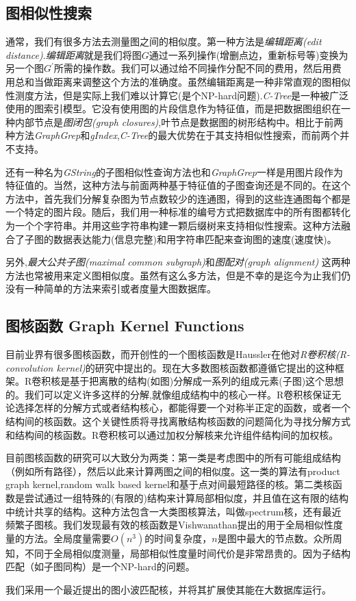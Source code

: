 \documentclass{article}
\begin{document}
\subsection{图相似性搜索}
通常，我们有很多方法去测量图之间的相似度。第一种方法是\emph{编辑距离(edit distance)}.\emph{编辑距离}就是我们将图$G$通过一系列操作(增删点边，重新标号等)变换为另一个图$G^{'}$所需的操作数。我们可以通过给不同操作分配不同的费用，然后用费用总和当做距离来调整这个方法的准确度。虽然编辑距离是一种非常直观的图相似性测度方法，但是实际上我们难以计算它(是个NP-hard问题).\emph{C-Tree}\cite{C-Tree}是一种被广泛使用的图索引模型。它没有使用图的片段信息作为特征值，而是把数据图组织在一种内部节点是\emph{图闭包(graph closures)},叶节点是数据图的树形结构中。相比于前两种方法\emph{GraphGrep}和\emph{gIndex},\emph{C-Tree}的最大优势在于其支持相似性搜索，而前两个并不支持。

还有一种名为\emph{GString}的子图相似性查询方法也和\emph{GraphGrep}一样是用图片段作为特征值的。当然，这种方法与前面两种基于特征值的子图查询还是不同的。在这个方法中，首先我们分解复杂图为节点数较少的连通图，得到的这些连通图每个都是一个特定的图片段。随后，我们用一种标准的编号方式把数据库中的所有图都转化为一个个字符串。并用这些字符串构建一颗后缀树来支持相似性搜索。这种方法融合了子图的数据表达能力(信息完整)和用字符串匹配来查询图的速度(速度快)。

另外,\emph{最大公共子图(maximal common subgraph)}\cite{mcs}和\emph{图配对(graph alignment)}\cite{assignment,assigment08} 这两种方法也常被用来定义图相似度。虽然有这么多方法，但是不幸的是迄今为止我们仍没有一种简单的方法来索引或者度量大图数据库。

\subsection{图核函数 Graph Kernel Functions}
目前业界有很多图核函数，而开创性的一个图核函数是Haussler在他对\emph{R卷积核(R-convolution kernel)}的研究中提出的。现在大多数图核函数都遵循它提出的这种框架。R卷积核是基于把离散的结构(如图)分解成一系列的组成元素(子图)这个思想的。我们可以定义许多这样的分解,就像组成结构中的核心一样。R卷积核保证无论选择怎样的分解方式或者结构核心，都能得要一个对称半正定的函数，或者一个结构间的核函数。这个关键性质将寻找离散结构核函数的问题简化为寻找分解方式和结构间的核函数。R卷积核可以通过加权分解核来允许组件结构间的加权核。

目前图核函数的研究可以大致分为两类：第一类是考虑图中的所有可能组成结构（例如所有路径），然后以此来计算两图之间的相似度。这一类的算法有product graph kernel,random walk based kernel和基于点对间最短路径的核。第二类核函数是尝试通过一组特殊的(有限的)结构来计算局部相似度，并且值在这有限的结构中统计共享的结构。这种方法包含一大类图核算法，叫做spectrum核，还有最近频繁子图核。我们发现最有效的核函数是Vishwanathan提出的用于全局相似性度量的方法。全局度量需要$O(n^3 )$的时间复杂度，$n$是图中最大的节点数。众所周知，不同于全局相似度测量，局部相似性度量时间代价是非常昂贵的。因为子结构匹配（如子图同构）是一个NP-hard的问题。

我们采用一个最近提出的图小波匹配核，并将其扩展使其能在大数据库运行。

\ifx\allfiles\undefined
%
%
\end{document}
